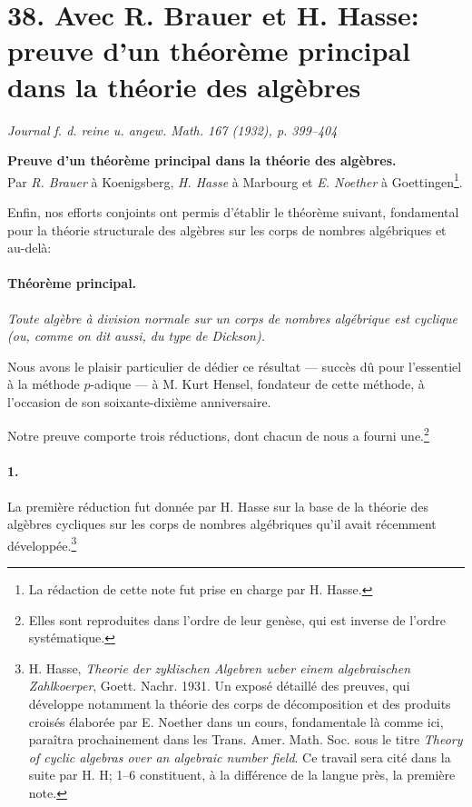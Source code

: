 \section*{38. Avec R. Brauer et H. Hasse: preuve d'un théorème principal dans la théorie des algèbres}

\begin{center}
\emph{Journal f. d. reine u. angew. Math. 167 (1932), p. 399--404}
\end{center}

\begin{center}
\textbf{Preuve d'un théorème principal dans la théorie des algèbres.}\\[0.5em]
Par \emph{R. Brauer} à Koenigsberg, \emph{H. Hasse} à Marbourg et \emph{E. Noether} à Goettingen\footnote{La rédaction de cette note fut prise en charge par H. Hasse.}.
\end{center}

Enfin, nos efforts conjoints ont permis d'établir le théorème suivant, fondamental pour la théorie structurale des algèbres sur les corps de nombres algébriques et au-delà:

\paragraph{Théorème principal.}
\emph{Toute algèbre à division normale sur un corps de nombres algébrique est cyclique (ou, comme on dit aussi, du type de Dickson).}

Nous avons le plaisir particulier de dédier ce résultat --- succès dû pour l'essentiel à la méthode \(p\)-adique --- à M. Kurt Hensel, fondateur de cette méthode, à l'occasion de son soixante-dixième anniversaire.

Notre preuve comporte trois réductions, dont chacun de nous a fourni une.\footnote{Elles sont reproduites dans l'ordre de leur genèse, qui est inverse de l'ordre systématique.}

\paragraph{1.}
La première réduction fut donnée par H. Hasse sur la base de la théorie des algèbres cycliques sur les corps de nombres algébriques qu'il avait récemment développée.\footnote{H. Hasse, \emph{Theorie der zyklischen Algebren ueber einem algebraischen Zahlkoerper}, Goett. Nachr. 1931. Un exposé détaillé des preuves, qui développe notamment la théorie des corps de décomposition et des produits croisés élaborée par E. Noether dans un cours, fondamentale là comme ici, paraîtra prochainement dans les Trans. Amer. Math. Soc. sous le titre \emph{Theory of cyclic algebras over an algebraic number field}. Ce travail sera cité dans la suite par H. H; 1--6 constituent, à la différence de la langue près, la première note.}

